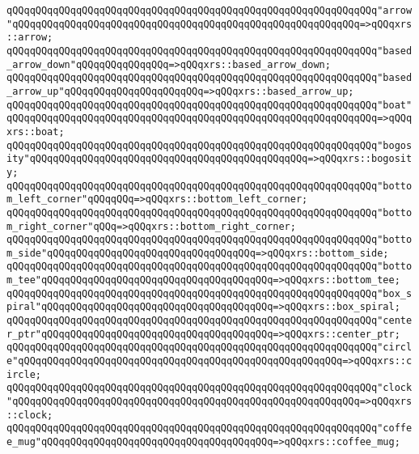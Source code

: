 \verb|qQQqqQQqqQQqqQQqqQQqqQQqqQQqqQQqqQQqqQQqqQQqqQQqqQQqqQQqqQQqqQQq"arrow"qQQqqQQqqQQqqQQqqQQqqQQqqQQqqQQqqQQqqQQqqQQqqQQqqQQqqQQqqQQq=>qQQqxrs::arrow;|\newline
\verb|qQQqqQQqqQQqqQQqqQQqqQQqqQQqqQQqqQQqqQQqqQQqqQQqqQQqqQQqqQQqqQQq"based_arrow_down"qQQqqQQqqQQqqQQq=>qQQqxrs::based_arrow_down;|\newline
\verb|qQQqqQQqqQQqqQQqqQQqqQQqqQQqqQQqqQQqqQQqqQQqqQQqqQQqqQQqqQQqqQQq"based_arrow_up"qQQqqQQqqQQqqQQqqQQqqQQq=>qQQqxrs::based_arrow_up;|\newline
\verb|qQQqqQQqqQQqqQQqqQQqqQQqqQQqqQQqqQQqqQQqqQQqqQQqqQQqqQQqqQQqqQQq"boat"qQQqqQQqqQQqqQQqqQQqqQQqqQQqqQQqqQQqqQQqqQQqqQQqqQQqqQQqqQQqqQQq=>qQQqxrs::boat;|\newline
\verb|qQQqqQQqqQQqqQQqqQQqqQQqqQQqqQQqqQQqqQQqqQQqqQQqqQQqqQQqqQQqqQQq"bogosity"qQQqqQQqqQQqqQQqqQQqqQQqqQQqqQQqqQQqqQQqqQQqqQQq=>qQQqxrs::bogosity;|\newline
\verb|qQQqqQQqqQQqqQQqqQQqqQQqqQQqqQQqqQQqqQQqqQQqqQQqqQQqqQQqqQQqqQQq"bottom_left_corner"qQQqqQQq=>qQQqxrs::bottom_left_corner;|\newline
\verb|qQQqqQQqqQQqqQQqqQQqqQQqqQQqqQQqqQQqqQQqqQQqqQQqqQQqqQQqqQQqqQQq"bottom_right_corner"qQQq=>qQQqxrs::bottom_right_corner;|\newline
\verb|qQQqqQQqqQQqqQQqqQQqqQQqqQQqqQQqqQQqqQQqqQQqqQQqqQQqqQQqqQQqqQQq"bottom_side"qQQqqQQqqQQqqQQqqQQqqQQqqQQqqQQqqQQq=>qQQqxrs::bottom_side;|\newline
\verb|qQQqqQQqqQQqqQQqqQQqqQQqqQQqqQQqqQQqqQQqqQQqqQQqqQQqqQQqqQQqqQQq"bottom_tee"qQQqqQQqqQQqqQQqqQQqqQQqqQQqqQQqqQQqqQQq=>qQQqxrs::bottom_tee;|\newline
\verb|qQQqqQQqqQQqqQQqqQQqqQQqqQQqqQQqqQQqqQQqqQQqqQQqqQQqqQQqqQQqqQQq"box_spiral"qQQqqQQqqQQqqQQqqQQqqQQqqQQqqQQqqQQqqQQq=>qQQqxrs::box_spiral;|\newline
\verb|qQQqqQQqqQQqqQQqqQQqqQQqqQQqqQQqqQQqqQQqqQQqqQQqqQQqqQQqqQQqqQQq"center_ptr"qQQqqQQqqQQqqQQqqQQqqQQqqQQqqQQqqQQqqQQq=>qQQqxrs::center_ptr;|\newline
\verb|qQQqqQQqqQQqqQQqqQQqqQQqqQQqqQQqqQQqqQQqqQQqqQQqqQQqqQQqqQQqqQQq"circle"qQQqqQQqqQQqqQQqqQQqqQQqqQQqqQQqqQQqqQQqqQQqqQQqqQQqqQQq=>qQQqxrs::circle;|\newline
\verb|qQQqqQQqqQQqqQQqqQQqqQQqqQQqqQQqqQQqqQQqqQQqqQQqqQQqqQQqqQQqqQQq"clock"qQQqqQQqqQQqqQQqqQQqqQQqqQQqqQQqqQQqqQQqqQQqqQQqqQQqqQQqqQQq=>qQQqxrs::clock;|\newline
\verb|qQQqqQQqqQQqqQQqqQQqqQQqqQQqqQQqqQQqqQQqqQQqqQQqqQQqqQQqqQQqqQQq"coffee_mug"qQQqqQQqqQQqqQQqqQQqqQQqqQQqqQQqqQQqqQQq=>qQQqxrs::coffee_mug;|\newline
